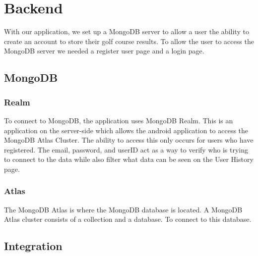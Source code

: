 \section{Backend}
With our application, we set up a MongoDB server to allow a user the ability to create an account to store their golf course results. To allow the user to access the MongoDB server we needed a register user page and a login page.
\subsection{MongoDB}
\subsubsection{Realm}
To connect to MongoDB, the application uses MongoDB Realm. This is an application on the server-side which allows the android application to access the MongoDB Atlas Cluster. The ability to access this only occurs for users who have registered. The email, password, and userID act as a way to verify who is trying to connect to the data while also filter what data can be seen on the User History page.
\subsubsection{Atlas}
The MongoDB Atlas is where the MongoDB database is located. A MongoDB Atlas cluster consists of a collection and a database. To connect to this database.
\subsection{Integration}
